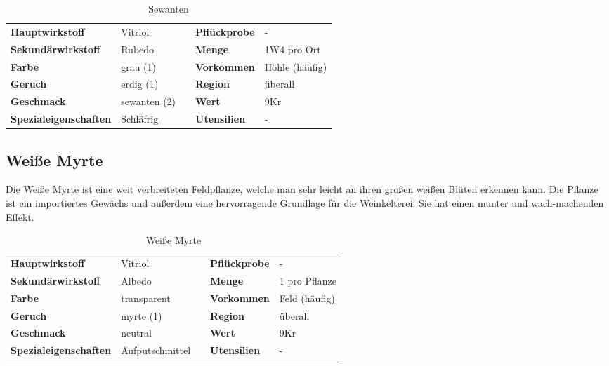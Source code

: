 \begin{table}[H] 
\begin{center} 
\begin{tabular}{|l|l|p{1cm}|l|l|} 
  	\cline{1-2} \cline{4-5} 
  	\textbf{Hauptwirkstoff} & Vitriol && \textbf{Pflückprobe} & - \\ \cline{1-2} \cline{4-5} 
  	\textbf{Sekundärwirkstoff} & Rubedo && \textbf{Menge} & 1W4 pro Ort \\ \cline{1-2} \cline{4-5} 
  	\textbf{Farbe} & grau (1) && \textbf{Vorkommen} & Höhle (häufig) \\ \cline{1-2} \cline{4-5} 
  	\textbf{Geruch} & erdig (1) && \textbf{Region} & überall \\ \cline{1-2} \cline{4-5} 
  	\textbf{Geschmack} & sewanten (2) && \textbf{Wert} & 9Kr \\ \cline{1-2} \cline{4-5} 
  	\textbf{Spezialeigenschaften} & Schläfrig && \textbf{Utensilien} & - \\ \cline{1-2} \cline{4-5} 
\end{tabular} 
\end{center} 
\caption{Sewanten} 
\label{tab:sewanten} 
\end{table}


\subsection{Weiße Myrte}
Die Weiße Myrte ist eine weit verbreiteten Feldpflanze, welche man sehr leicht an ihren großen weißen Blüten erkennen kann. Die Pflanze ist ein importiertes Gewächs und außerdem eine hervorragende Grundlage für die Weinkelterei. Sie hat einen munter und wach-machenden Effekt.

\begin{table}[H] 
\begin{center} 
\begin{tabular}{|l|l|p{1cm}|l|l|} 
  	\cline{1-2} \cline{4-5} 
  	\textbf{Hauptwirkstoff} & Vitriol && \textbf{Pflückprobe} & - \\ \cline{1-2} \cline{4-5} 
  	\textbf{Sekundärwirkstoff} & Albedo && \textbf{Menge} & 1 pro Pflanze \\ \cline{1-2} \cline{4-5} 
  	\textbf{Farbe} & transparent && \textbf{Vorkommen} & Feld (häufig) \\ \cline{1-2} \cline{4-5} 
  	\textbf{Geruch} & myrte (1) && \textbf{Region} & überall \\ \cline{1-2} \cline{4-5} 
  	\textbf{Geschmack} & neutral && \textbf{Wert} & 9Kr \\ \cline{1-2} \cline{4-5} 
  	\textbf{Spezialeigenschaften} & Aufputschmittel && \textbf{Utensilien} & - \\ \cline{1-2} \cline{4-5} 
\end{tabular} 
\end{center} 
\caption{Weiße Myrte} 
\label{tab:weisse_myrte} 
\end{table}


